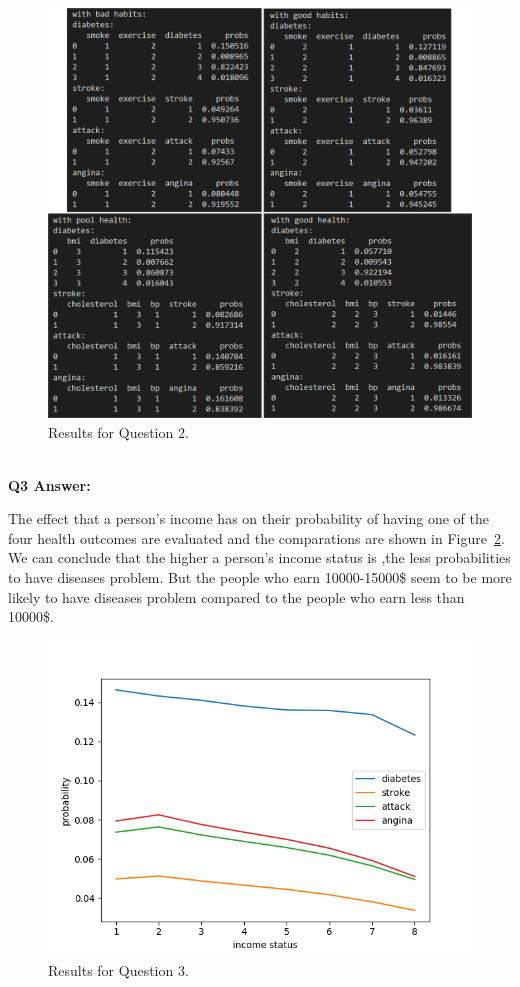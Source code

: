 \documentclass[aps,letterpaper,10pt]{revtex4}
\begin{document}
\begin{figure}[H]
        \centering
        \includegraphics[width=0.95\linewidth]{T2.jpg}
        \caption{Results for Question 2.}
        \label{fig:Q2}
     \end{figure}
~\\
\textbf{Q3 Answer:} 

The  effect that a person's income has on their probability of having one of the four health outcomes are evaluated and the comparations are shown in Figure~\ref{fig:Q3}. We can conclude that the higher a person's income status is ,the less probabilities to have diseases problem. But the people who earn 10000-15000\$ seem to be more likely to have diseases problem compared to the people who earn less than 10000\$.
\begin{figure}[H]
    \centering
    \includegraphics[width=0.65\linewidth]{Figure_T3.png}
    \caption{Results for Question 3.}
    \label{fig:Q3}
 \end{figure}
\end{document}
